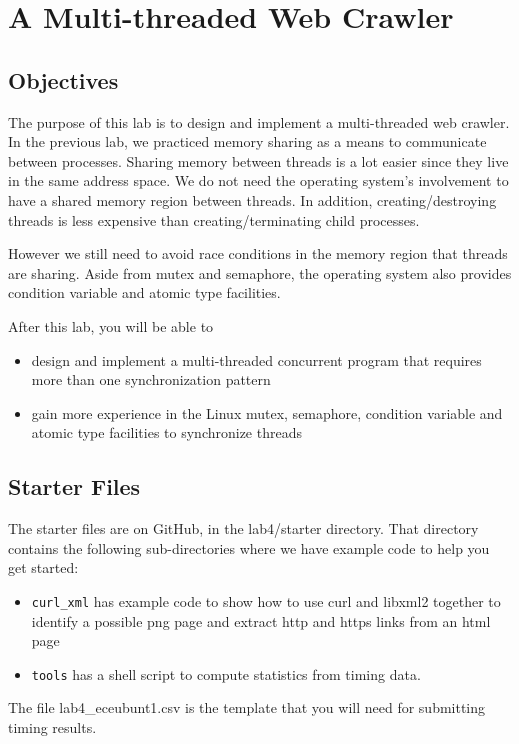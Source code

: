 \chapter{A Multi-threaded Web Crawler}

\section{Objectives}
The purpose of this lab is to design and implement a multi-threaded web crawler. In the previous lab, we practiced memory sharing as a means to communicate between processes. Sharing memory between threads is a lot easier since they live in the same address space. We do not need the operating system's involvement to have a shared memory region between threads. In addition, creating/destroying threads is less expensive than creating/terminating child processes. 

However we still need to avoid race conditions in the memory region that threads are sharing. Aside from mutex and semaphore, the operating system also provides condition variable and atomic type facilities. 

After this lab, you will be able to
\begin{itemize}
\item design and implement a multi-threaded concurrent program that requires more than one synchronization pattern
\item gain more experience in the Linux mutex, semaphore, condition variable and atomic type facilities to synchronize threads
\end{itemize}

\section{Starter Files}
The starter files are on GitHub, in the lab4/starter directory. That directory contains the following sub-directories where we have example code to help you get started:

\begin{itemize}
\item \verb+curl_xml+ has example code to show how to use curl and libxml2 together to identify a possible png page and extract http and https links from an html page
\item \verb+tools+ has a shell script to compute statistics from timing data.
\end{itemize}
The file lab4\_eceubunt1.csv is the template that you will need for submitting timing results.

